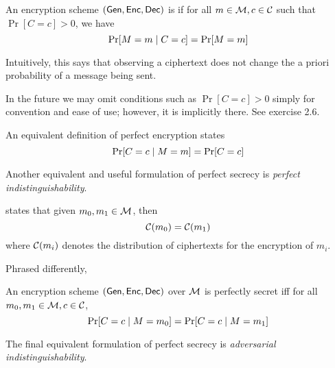 \begin{definition}
    An encryption scheme $(\operatorname{\mathsf{Gen}}, \operatorname{\mathsf{Enc}}, \operatorname{\mathsf{Dec}})$ is  if for all $m \in \mathcal M, c \in \mathcal C$ such that $\Pr[C = c] > 0$, we have 
    \[ \Pr[M = m \mid C = c] = \Pr [M = m]\] %
\end{definition}

\begin{remark}
   Intuitively, this says that observing a ciphertext does not change the a priori probability of a message being sent. 
\end{remark}

\begin{remark}
    In the future we may omit conditions such as $\Pr[C = c] > 0$ simply for convention and ease of use; however, it is implicitly there. See exercise 2.6.
\end{remark}

\begin{lemma}
    An equivalent definition of perfect encryption states
    \[\Pr[C = c \mid M = m] = \Pr[C = c] \]
\end{lemma}

Another equivalent and useful formulation of perfect secrecy is \textit{perfect indistinguishability}. %
\begin{definition}
    states that given $m_0, m_1 \in \mathcal M$, then 
   \[\mathcal C(m_0) = \mathcal C(m_1) \]
   where $\mathcal C(m_i)$ denotes the distribution of ciphertexts for the encryption of $m_i$.
\end{definition}

Phrased differently,
\begin{lemma}
An encryption scheme $\operatorname{(\operatorname{\mathsf{Gen}}, \operatorname{\mathsf{Enc}}, \operatorname{\mathsf{Dec}})}$ over $\mathcal M$ is perfectly secret iff for all $m_0, m_1 \in \mathcal M, c \in \mathcal C$,
\[\Pr[C = c \mid M = m_0] = \Pr[C = c \mid  M = m_1] \]
\end{lemma}

The final equivalent formulation of perfect secrecy is \textit{adversarial indistinguishability}.


